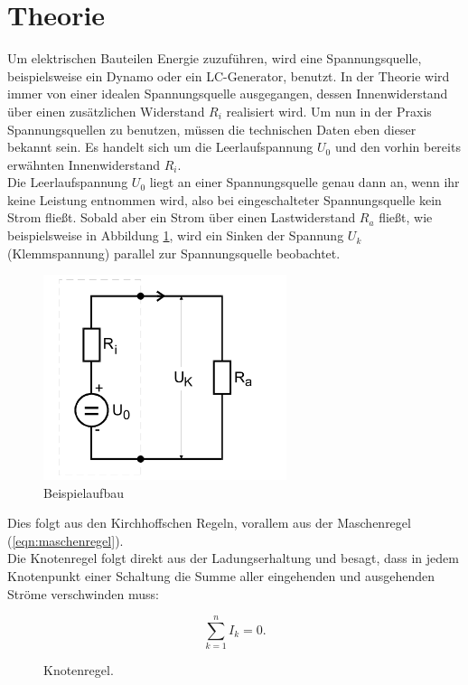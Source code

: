 \section{Theorie}
\label{sec:Theorie}
Um elektrischen Bauteilen Energie zuzuführen, wird eine Spannungsquelle, beispielsweise ein Dynamo oder ein LC-Generator, benutzt.
In der Theorie wird immer von einer idealen Spannungsquelle ausgegangen, dessen Innenwiderstand über einen zusätzlichen Widerstand $R_i$ realisiert wird.
Um nun in der Praxis Spannungsquellen zu benutzen, müssen die technischen Daten eben dieser bekannt sein.
Es handelt sich um die Leerlaufspannung $U_0$ und den vorhin bereits erwähnten Innenwiderstand $R_i$.\\
Die Leerlaufspannung $U_0$ liegt an einer Spannungsquelle genau dann an, wenn ihr keine Leistung entnommen wird, also bei eingeschalteter Spannungsquelle kein Strom fließt.
Sobald aber ein Strom über einen Lastwiderstand $R_a$ fließt, wie beispielsweise in Abbildung \ref{fig:1}, wird ein Sinken der Spannung $U_k$ (Klemmspannung) parallel zur Spannungsquelle beobachtet.

\begin{figure}[H]
  \centering
  \includegraphics[height=6cm]{innenwiderstand.png}
  \caption{Beispielaufbau \cite{sample}}
  \label{fig:1}
\end{figure}

Dies folgt aus den Kirchhoffschen Regeln, vorallem aus der Maschenregel (\ref{eqn:maschenregel}).\\
Die Knotenregel folgt direkt aus der Ladungserhaltung und besagt, dass in jedem Knotenpunkt einer Schaltung die Summe aller eingehenden und ausgehenden Ströme verschwinden muss:

\begin{equation}
  \sum_{k=1}^n I_k = 0.
  \label{eqn:knotenregel}
\end{equation}

\begin{figure}[H]
  \centering
  \caption{Knotenregel.}
  \label{fig:knotenregel}
\end{figure}

